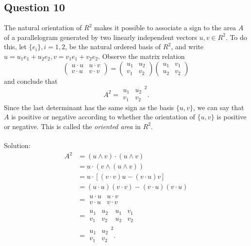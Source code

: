 \documentclass[12pt]{article}
\begin{document}
\subsection*{Question 10}
The natural orientation of $R^2$ makes it possible to associate a sign to the area $A$ of a parallelogram generated by two linearly independent vectors $u,v \in R^2$. To do this, let $\{e_i\}, i = 1, 2$, be the natural ordered basis of $R^2$, and write $u = u_1e_1 +u_2e_2, v = v_1e_1 +v_2e_2$. Observe the matrix relation \begin{equation*}
    \begin{pmatrix}
    u \cdot u & u \cdot v\\
    v \cdot u & v \cdot v
    \end{pmatrix} =
    \begin{pmatrix}
    u_1 & u_2\\
    v_1 & v_2
    \end{pmatrix}
    \begin{pmatrix}
    u_1 & v_1\\
    u_2 & v_2
    \end{pmatrix}
\end{equation*}
and conclude that \begin{equation*}
    A^2 = \begin{array}{|cc|}
         u_1 & u_2\\
         v_1 & v_2
    \end{array}^2.
\end{equation*}
Since the last determinant has the same sign as the basis $\{u,v\}$, we can say that $A$ is positive or negative according to whether the orientation of $\{u,v\}$ is positive or negative. This is called the \textit{oriented area} in $R^2$.\\\\
Solution:
\begin{align*}
    A^2 &= (u \wedge v) \cdot (u \wedge v)\\
    &= u \cdot (v \wedge (u \wedge v))\\
    &= u \cdot [(v \cdot v)u - (v \cdot u)v]\\
    &= (u \cdot u)(v \cdot v) - (v \cdot u)(v \cdot u)\\
    &= \begin{array}{|cc|}
    u \cdot u & u \cdot v\\
    v \cdot u & v \cdot v
    \end{array}\\
    &= \begin{array}{|cc|}
    u_1 & u_2\\
    v_1 & v_2
    \end{array}~
    \begin{array}{|cc|}
    u_1 & v_1\\
    u_2 & v_2
    \end{array}\\
    &=\begin{array}{|cc|}
    u_1 & u_2\\
    v_1 & v_2
    \end{array}^2.
\end{align*}
\end{document}
